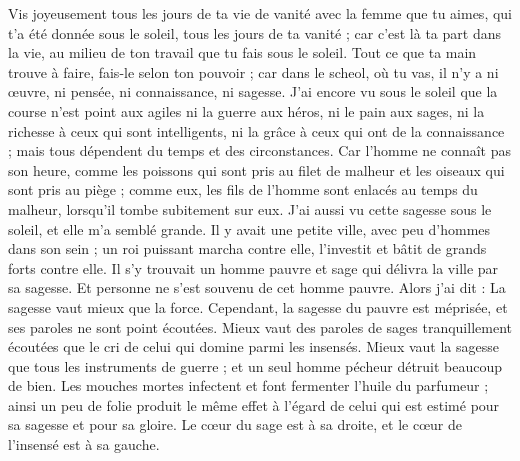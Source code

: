 \begin{multicols}{2}
Vis joyeusement tous les jours de ta vie de vanité avec la femme que tu aimes, qui t’a été donnée sous le soleil, tous les jours de ta vanité ; car c'est là ta part dans la vie, au milieu de ton travail que tu fais sous le soleil.
Tout ce que ta main trouve à faire, fais-le selon ton pouvoir ; car dans le scheol, où tu vas, il n'y a ni œuvre, ni pensée, ni connaissance, ni sagesse.
J’ai encore vu sous le soleil que la course n'est point aux agiles ni la guerre aux héros, ni le pain aux sages, ni la richesse à ceux qui sont intelligents, ni la grâce à ceux qui ont de la connaissance ; mais tous dépendent du temps et des circonstances.
Car l'homme ne connaît pas son heure, comme les poissons qui sont pris au filet de malheur et les oiseaux qui sont pris au piège ; comme eux, les fils de l’homme sont enlacés au temps du malheur, lorsqu'il tombe subitement sur eux.
J'ai aussi vu cette sagesse sous le soleil, et elle m'a semblé grande.
Il y avait une petite ville, avec peu d’hommes dans son sein ; un roi puissant marcha contre elle, l’investit et bâtit de grands forts contre elle.
Il s'y trouvait un homme pauvre et sage qui délivra la ville par sa sagesse. Et personne ne s'est souvenu de cet homme pauvre.
Alors j'ai dit : La sagesse vaut mieux que la force. Cependant, la sagesse du pauvre est méprisée, et ses paroles ne sont point écoutées.
Mieux vaut des paroles de sages tranquillement écoutées que le cri de celui qui domine parmi les insensés.
Mieux vaut la sagesse que tous les instruments de guerre ; et un seul homme pécheur détruit beaucoup de bien.
\VerseOne{}Les mouches mortes infectent et font fermenter l’huile du parfumeur ; ainsi un peu de folie produit le même effet à l'égard de celui qui est estimé pour sa sagesse et pour sa gloire.
Le cœur du sage est à sa droite, et le cœur de l’insensé est à sa gauche.

\end{multicols}
